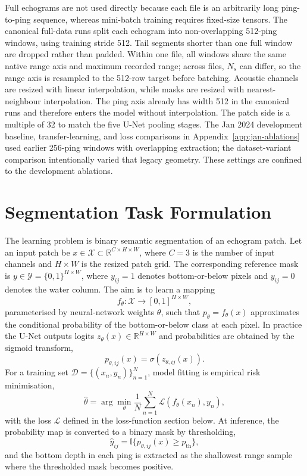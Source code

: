 Full echograms are not used directly because each file is an arbitrarily long ping-to-ping sequence, whereas mini-batch training requires fixed-size tensors. The canonical full-data runs split each echogram into non-overlapping 512-ping windows, using training stride 512. Tail segments shorter than one full window are dropped rather than padded. Within one file, all windows share the same native range axis and maximum recorded range; across files, $N_s$ can differ, so the range axis is resampled to the 512-row target before batching. Acoustic channels are resized with linear interpolation, while masks are resized with nearest-neighbour interpolation. The ping axis already has width 512 in the canonical runs and therefore enters the model without interpolation. The patch side is a multiple of 32 to match the five U-Net pooling stages. The Jan 2024 development baseline, transfer-learning, and loss comparisons in Appendix~\ref{app:jan-ablations} used earlier 256-ping windows with overlapping extraction; the dataset-variant comparison intentionally varied that legacy geometry. These settings are confined to the development ablations.

\section{Segmentation Task Formulation}

The learning problem is binary semantic segmentation of an echogram patch. Let an input patch be
$x \in \mathcal{X} \subset \mathbb{R}^{C \times H \times W}$, where $C=3$ is the number of input channels and $H \times W$ is the resized patch grid. The corresponding reference mask is
$y \in \mathcal{Y} = \{0,1\}^{H \times W}$, where $y_{ij}=1$ denotes bottom-or-below pixels and $y_{ij}=0$ denotes the water column. The aim is to learn a mapping
\begin{equation}
    f_\theta : \mathcal{X} \rightarrow [0,1]^{H \times W},
\end{equation}
parameterised by neural-network weights $\theta$, such that $p_\theta = f_\theta(x)$ approximates the conditional probability of the bottom-or-below class at each pixel. In practice the U-Net outputs logits $z_\theta(x) \in \mathbb{R}^{H \times W}$ and probabilities are obtained by the sigmoid transform,
\begin{equation}
    p_{\theta,ij}(x) = \sigma(z_{\theta,ij}(x)).
\end{equation}
For a training set $\mathcal{D} = \{(x_n, y_n)\}_{n=1}^{N}$, model fitting is empirical risk minimisation,
\begin{equation}
    \hat{\theta}
    = \arg\min_{\theta}
    \frac{1}{N} \sum_{n=1}^{N}
    \mathcal{L}\!\left(f_\theta(x_n), y_n\right),
    \label{eq:segmentation-erm}
\end{equation}
with the loss $\mathcal{L}$ defined in the loss-function section below. At inference, the probability map is converted to a binary mask by thresholding,
\begin{equation}
    \hat{y}_{ij} = \mathbb{I}\{p_{\theta,ij}(x) \geq p_{\mathrm{th}}\},
\end{equation}
and the bottom depth in each ping is extracted as the shallowest range sample where the thresholded mask becomes positive.

